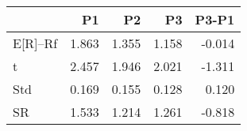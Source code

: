 \begin{tabular}{lrrrr}
\toprule
 & P1 & P2 & P3 & P3-P1 \\
\midrule
E[R]--Rf & 1.863 & 1.355 & 1.158 & -0.014 \\
t & 2.457 & 1.946 & 2.021 & -1.311 \\
Std & 0.169 & 0.155 & 0.128 & 0.120 \\
SR & 1.533 & 1.214 & 1.261 & -0.818 \\
\bottomrule
\end{tabular}
